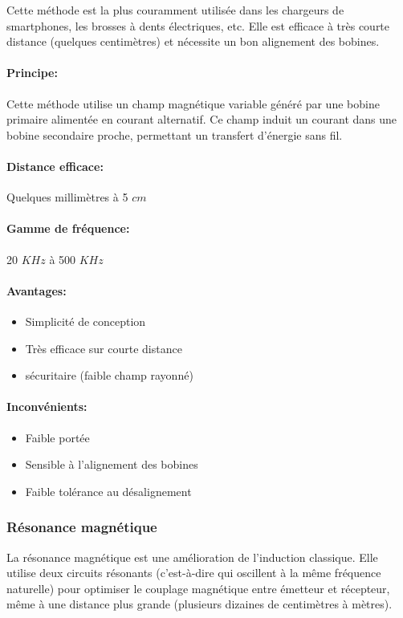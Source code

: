 \documentclass[12pt,a4paper,titlepage,notitlepage]{article}
\begin{document}
	Cette méthode est la plus couramment utilisée dans les chargeurs de smartphones, les brosses à dents électriques, etc. Elle est efficace à très courte distance (quelques centimètres) et nécessite un bon alignement des bobines.
	\paragraph{Principe: \\}
	Cette méthode utilise un champ magnétique variable généré par une bobine primaire alimentée en courant alternatif. Ce champ induit un courant dans une bobine secondaire proche, permettant un transfert d’énergie sans fil.
	\paragraph{Distance efficace: \\}
	Quelques millimètres à 5 $cm$
	\paragraph{Gamme de fréquence: \\}
	20 $KHz$ à 500 $KHz$
	\paragraph{Avantages: }
	\begin{itemize}
		\item Simplicité de conception
		\item Très efficace sur courte distance
		\item sécuritaire (faible champ rayonné)
	\end{itemize}
	\paragraph{Inconvénients: }
	\begin{itemize}
		\item Faible portée
		\item Sensible à l’alignement des bobines
		\item Faible tolérance au désalignement
	\end{itemize}
	
	
	\subsubsection{Résonance magnétique}
	La résonance magnétique est une amélioration de l’induction classique. Elle utilise deux circuits résonants (c’est-à-dire qui oscillent à la même fréquence naturelle) pour optimiser le couplage magnétique entre émetteur et récepteur, même à une distance plus grande (plusieurs dizaines de centimètres à mètres).
	
\end{document}
